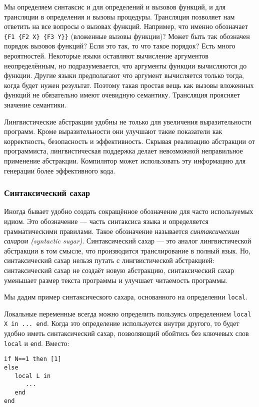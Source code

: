 Мы определяем синтаксис и для определений и вызовов функций, и для трансляции в определения и вызовы процедуры. Трансляция позволяет нам ответить на все вопросы о вызовах функций. Например, что именно обозначает \lstinline|{F1 {F2 X} {F3 Y}}| (вложенные вызовы функции)? Может быть так обозначен порядок вызовов функций? Если это так, то что такое порядок? Есть много вероятностей. Некоторые языки оставляют вычисление аргументов неопределённым, но подразумевается, что аргументы функции вычисляются до функции. Другие языки предполагают что аргумент вычисляется только тогда, когда будет нужен результат. Поэтому такая простая вещь как вызовы вложенных функций не обязательно имеют очевидную семантику. Трансляция проясняет значение семантики.

Лингвистические абстракции удобны не только для увеличения выразительности программ. Кроме выразительности они улучшают такие показатели как корректность, безопасность и эффективность. Скрывая реализацию абстракции от программиста, лингвистическая поддержка делает невозможной неправильное применение абстракции. Компилятор может использовать эту информацию для генерации более эффективного кода.

\subsubsection{Синтаксический сахар}

Иногда бывает удобно создать сокращённое обозначение для часто используемых идиом. Это обозначение --- часть синтаксиса языка и определяется грамматическими правилами. Такое обозначение называется \emph{синтаксическим сахаром (syntactic sugar)}. Синтаксический сахар --- это аналог лингвистической абстракции в том смысле, что производится транслирование в полный язык. Но, синтаксический сахар нельзя путать с лингвистической абстракцией: синтаксический сахар не создаёт новую абстракцию, синтаксический сахар уменьшает размер текста программы и улучшает читаемость программы.

Мы дадим пример синтаксического сахара, основанного на определении \lstinline|local|.



Локальные переменные всегда можно определить пользуясь определением \lstinline|local X in ... end|. Когда это определение используется внутри другого, то будет удобно иметь синтаксический сахар, позволяющий обойтись без ключевых слов \lstinline|local| и \lstinline|end|. Вместо:

\begin{lstlisting}
if N==1 then [1]
else
   local L in
      ...
   end
end
\end{lstlisting}

